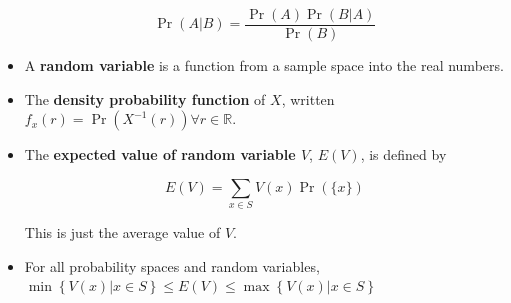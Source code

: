 \documentclass[12pt]{scrartcl}
\begin{document}
\begin{itemize}
        \begin{equation*}
            \Pr(A|B) = \frac{\Pr(A) \Pr(B | A)}{\Pr(B)}
        \end{equation*}

    \item A \textbf{random variable} is a function from a sample space into the real numbers.
    \item The \textbf{density probability function} of $X$, written $f_x (r) = \Pr(X^{-1}(r)) \forall r \in \mathbb{R}$.
    \item The \textbf{expected value of random variable $V$}, $E(V)$, is defined by

        \begin{equation*}
            E(V) = \sum _{x \in S} V(x) \Pr(\{ x \})
        \end{equation*}

        This is just the average value of $V$.

    \item For all probability spaces and random variables, $\min \left\{ V(x) | x \in S \right\} \leq E(V) \leq \max \left\{ V(x) | x \in S \right\}$
\end{itemize}
\end{document}
